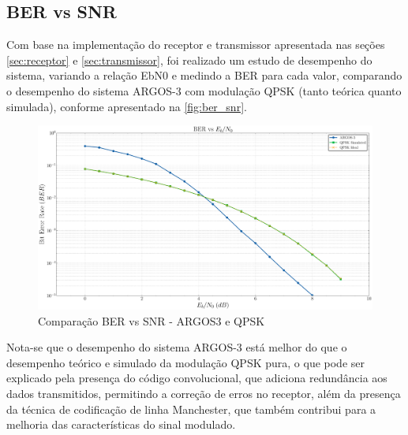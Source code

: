 \begin{apendicesenv}
\chapter{BER vs SNR}

Com base na implementação do receptor e transmissor apresentada nas seções \ref{sec:receptor} e \ref{sec:transmissor}, foi realizado um estudo de desempenho do sistema, variando a relação \gls{EbN0} e medindo a \gls{BER} para cada valor, comparando o desempenho do sistema ARGOS-3 com modulação \gls{QPSK} (tanto teórica quanto simulada), conforme apresentado na \autoref{fig:ber_snr}.

\begin{figure}[H]
	\centering
	\caption{Comparação BER vs SNR - ARGOS3 e QPSK}\label{fig:ber_snr}
	\includegraphics[width=\linewidth]{assets/apendice/ber_vs_ebn0.pdf}
\end{figure}

Nota-se que o desempenho do sistema ARGOS-3 está melhor do que o desempenho teórico e simulado da modulação \gls{QPSK} pura, o que pode ser explicado pela presença do código convolucional, que adiciona redundância aos dados transmitidos, permitindo a correção de erros no receptor, além da presença da técnica de codificação de linha \gls{Manchester}, que também contribui para a melhoria das características do sinal modulado.

\end{apendicesenv}
